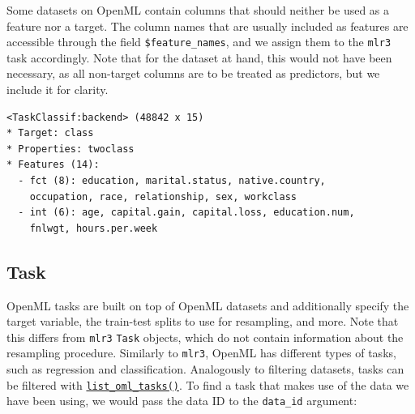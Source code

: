 Some datasets on OpenML contain columns that should neither be used as a
feature nor a target. The column names that are usually included as
features are accessible through the field \texttt{\$feature\_names}, and
we assign them to the \texttt{mlr3} task accordingly. Note that for the
dataset at hand, this would not have been necessary, as all non-target
columns are to be treated as predictors, but we include it for clarity.

\begin{Shaded}
\begin{Highlighting}[]
\SpecialCharTok{$}\SpecialCharTok{$}\OtherTok{=}\SpecialCharTok{$}
\end{Highlighting}
\end{Shaded}

\begin{verbatim}
<TaskClassif:backend> (48842 x 15)
* Target: class
* Properties: twoclass
* Features (14):
  - fct (8): education, marital.status, native.country,
    occupation, race, relationship, sex, workclass
  - int (6): age, capital.gain, capital.loss, education.num,
    fnlwgt, hours.per.week
\end{verbatim}

\hypertarget{sec-openml-task}{%
\subsection{Task}\label{sec-openml-task}}

OpenML tasks are built on top of OpenML datasets and additionally
specify the target variable, the train-test splits to use for
resampling, and more. Note that this differs from \texttt{mlr3}
\texttt{Task} objects, which do not contain information about the
resampling procedure. Similarly to \texttt{mlr3}, OpenML has different
types of tasks, such as regression and classification. Analogously to
filtering datasets, tasks can be filtered with
\href{https://mlr3oml.mlr-org.com/reference/list_oml.html}{\texttt{list\_oml\_tasks()}}.
To find a task that makes use of the data we have been using, we would
pass the data ID to the \texttt{data\_id} argument:

\begin{Shaded}
\begin{Highlighting}[]
\OtherTok{=} \NormalTok{(} \NormalTok{)}
\end{Highlighting}
\end{Shaded}

